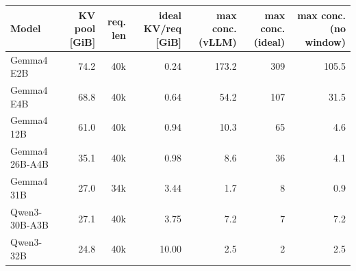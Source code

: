 \begin{tabular}{lrrrrrr}
\toprule
Model & KV pool [GiB] & req. len & ideal KV/req [GiB] & max conc. (vLLM) & max conc. (ideal) & max conc. (no window) \\
\midrule
Gemma4 E2B & 74.2 & 40k & 0.24 & 173.2 & 309 & 105.5 \\
Gemma4 E4B & 68.8 & 40k & 0.64 & 54.2 & 107 & 31.5 \\
Gemma4 12B & 61.0 & 40k & 0.94 & 10.3 & 65 & 4.6 \\
Gemma4 26B-A4B & 35.1 & 40k & 0.98 & 8.6 & 36 & 4.1 \\
Gemma4 31B & 27.0 & 34k & 3.44 & 1.7 & 8 & 0.9 \\
Qwen3-30B-A3B & 27.1 & 40k & 3.75 & 7.2 & 7 & 7.2 \\
Qwen3-32B & 24.8 & 40k & 10.00 & 2.5 & 2 & 2.5 \\
\bottomrule
\end{tabular}
